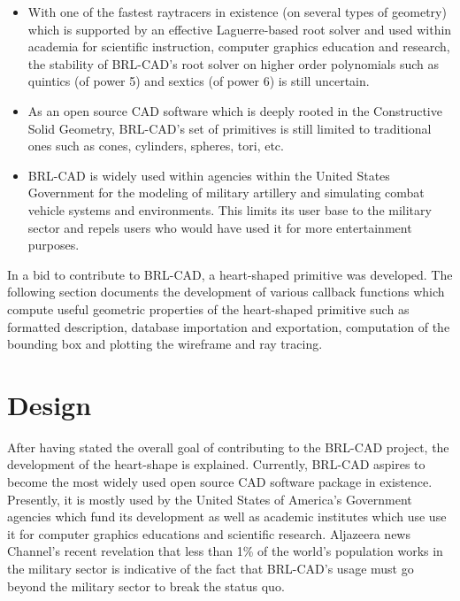 \begin{itemize}
\item With   one   of   the   fastest   ray­tracers   in   existence   (on   several   types   of  
geometry)   which   is   supported   by   an   effective   Laguerre-­based   root   solver  
and   used   within   academia   for   scientific   instruction,   computer   graphics  
education   and   research,   the   stability   of   BRL­-CAD's   root   solver   on  
higher ­order   polynomials   such   as   quintics   (of   power   5)   and   sextics   (of  
power 6) is still uncertain.

\item As   an   open   source   CAD   software   which   is   deeply   rooted   in   the  
Constructive   Solid   Geometry,   BRL-­CAD's   set   of   primitives   is   still   limited  
to traditional ones such as cones, cylinders, spheres, tori, etc.

\item BRL­-CAD   is   widely   used   within   agencies   within   the   United   States  
Government   for   the   modeling   of   military   artillery   and   simulating   combat
 vehicle   systems   and   environments. This limits its user base to the  
military sector and repels users who  would have used it for more entertainment purposes.
\end{itemize}

In a bid to contribute to BRL-CAD, a heart-­shaped primitive was developed. 
The following section documents the development of various callback functions which compute   useful  
geometric   properties   of   the   heart-­shaped   primitive   such   as   formatted  
description,   database   importation   and   exportation,   computation   of   the   bounding  
box and plotting the wireframe and ray tracing.


\section{Design}

\hspace{30} After   having   stated   the overall   goal   of   contributing   to   the   BRL-­CAD   
project, the development of the heart-shape is explained. Currently,  
BRL­-CAD   aspires   to   become   the   most   widely   used   open   source  
CAD   software   package   in   existence.   Presently,   it   is   mostly  
used   by   the   United   States   of   America's   Government   agencies   which   fund   its  
development   as   well   as   academic   institutes   which   use   use   it   for   computer  
graphics   educations   and   scientific   research.   Aljazeera   news   Channel's   recent  
revelation   that   less   than   1\%   of   the   world's   population   works   in   the   military   sector  
is   indicative   of   the   fact   that   BRL-­CAD's   usage   must   go   beyond   the   military  
sector to break the status­ quo.   

